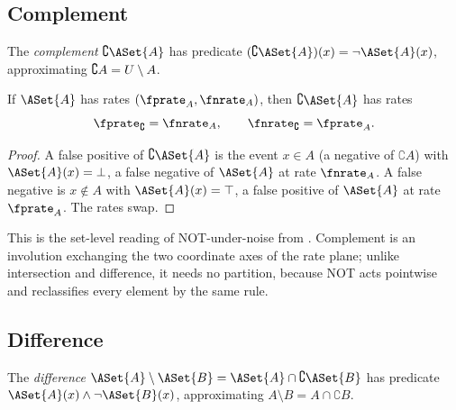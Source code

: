 \subsection*{Complement}

\begin{definition}
\label{def:complement-of-set}
The \emph{complement} $\complement \ASet{A}$ has predicate
$(\complement \ASet{A})(x) = \lnot \ASet{A}(x)$, approximating
$\complement A = U \setminus A$.
\end{definition}

\begin{proposition}
\label{prop:complement-swap}
If $\ASet{A}$ has rates $(\fprate_A, \fnrate_A)$, then $\complement \ASet{A}$
has rates
\begin{equation}
\label{eq:complement-swap}
  \fprate_\complement = \fnrate_A, \qquad \fnrate_\complement = \fprate_A.
\end{equation}
\end{proposition}

\begin{proof}
A false positive of $\complement \ASet{A}$ is the event $x \in A$ (a negative
of $\complement A$) with $\ASet{A}(x) = \bot$, a false negative of $\ASet{A}$
at rate $\fnrate_A$. A false negative is $x \notin A$ with $\ASet{A}(x) =
\top$, a false positive of $\ASet{A}$ at rate $\fprate_A$. The rates swap.
\end{proof}

This is the set-level reading of NOT-under-noise from .
Complement is an involution exchanging the two coordinate axes of the rate
plane; unlike intersection and difference, it needs no partition, because NOT
acts pointwise and reclassifies every element by the same rule.

\subsection*{Difference}

\begin{definition}
\label{def:difference-of-sets}
The \emph{difference} $\ASet{A} \setminus \ASet{B} = \ASet{A} \cap
\complement \ASet{B}$ has predicate $\ASet{A}(x) \land \lnot \ASet{B}(x)$,
approximating $A \setminus B = A \cap \complement B$.
\end{definition}

